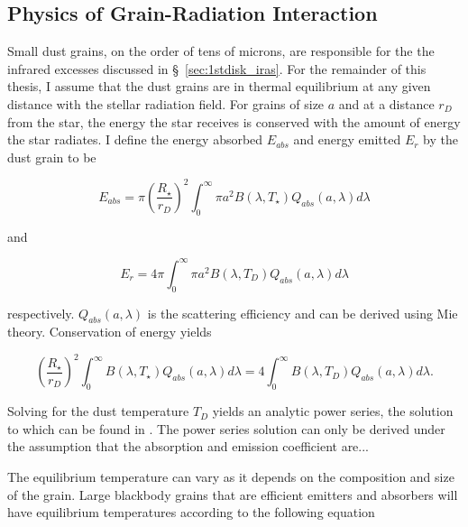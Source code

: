         
        \subsection{Physics of Grain-Radiation Interaction}            
            
            Small dust grains, on the order of tens of microns, are responsible for the the infrared excesses discussed in \S~\ref{sec:1stdisk_iras}. For the remainder of this thesis, I assume that the dust grains are in thermal equilibrium at any given distance with the stellar radiation field. For grains of size $a$ and at a distance $r_D$ from the star, the energy the star receives is conserved with the amount of energy the star radiates. I define the energy absorbed $E_{abs}$ and energy emitted $E_{r}$ by the dust grain to be
            
            \begin{equation}\label{eq:energy_absorbed}
            E_{abs} = \pi \left(\frac{R_\star}{r_D}\right)^2 \int_0^\infty \pi a^2 B(\lambda,T_\star) Q_{abs}(a,\lambda) d\lambda
            \end{equation}
            
            and
            
            \begin{equation}\label{eq:energy_emitted}
            E_{r} = 4\pi \int_0^\infty \pi a^2 B(\lambda,T_D) Q_{abs}(a,\lambda) d\lambda
            \end{equation}
            
            respectively. $Q_{abs}(a,\lambda)$ is the scattering efficiency and can be derived using Mie theory. Conservation of energy yields
            
            \begin{equation}\label{eq:conserve_energy}
             \left(\frac{R_\star}{r_D}\right)^2 \int_0^\infty B(\lambda,T_\star) Q_{abs}(a,\lambda) d\lambda = 4 \int_0^\infty B(\lambda,T_D) Q_{abs}(a,\lambda) d\lambda.
            \end{equation}
            
            Solving for the dust temperature $T_D$ yields an analytic power series, the solution to which can be found in \citet{Backman1993}.  The power series solution can only be derived under the assumption that the absorption and emission coefficient are...
            
            The equilibrium temperature can vary as it depends on the composition and size of the grain. Large blackbody grains that are efficient emitters and absorbers will have equilibrium temperatures according to the following equation 
            

